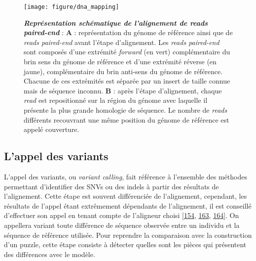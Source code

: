 \documentclass[12pt,a4paper,twoside]{ugathesis}
\theoremstyle{definition}
\theoremstyle{definition}
\theoremstyle{definition}
\theoremstyle{remark}
\begin{document}
\begin{figure}

{\centering \texttt{[image: figure/dna\_mapping]} 

}

\caption[Représentation schématique de l'alignement de reads paired-end]{\textbf{\emph{Représentation schématique de
l'alignement de reads paired-end}} : \textbf{A} : représentation du
génome de référence ainsi que de \emph{reads paired-end} avant l'étape
d'alignement. Les \emph{reads paired-end} sont composés d'une extrémité
\emph{forward} (en vert) complémentaire du brin sens du génome de
référence et d'une extrémité réverse (en jaune), complémentaire du brin
anti-sens du génome de référence. Chacune de ces extrémités est séparée
par un insert de taille connue mais de séquence inconnu. \textbf{B} :
après l'étape d'alignement, chaque \emph{read} est repositionné sur la
région du génome avec laquelle il présente la plus grande homologie de
séquence. Le nombre de \emph{reads} différents recouvrant une même
position du génome de référence est appelé couverture.}\label{fig:picdnamapping}
\end{figure}














\newpage

\subsection{L'appel des variants}\label{varcall}

L'appel des variants, ou \emph{variant calling}, fait référence à
l'ensemble des méthodes permettant d'identifier des SNVs ou des indels à
partir des résultats de l'alignement. Cette étape est souvent
différenciée de l'alignement, cependant, les résultats de l'appel étant
extrêmement dépendants de l'alignement, il est conseillé d'effectuer son
appel en tenant compte de l'aligneur choisi
{[}\protect\hyperlink{ref-Nielsen2011}{154},
\protect\hyperlink{ref-DePristo2011}{163},
\protect\hyperlink{ref-Lunter2011}{164}{]}. On appellera variant toute
différence de séquence observée entre un individu et la séquence de
référence utilisée. Pour reprendre la comparaison avec la construction
d'un puzzle, cette étape consiste à détecter quelles sont les pièces qui
présentent des différences avec le modèle.
\end{document}
